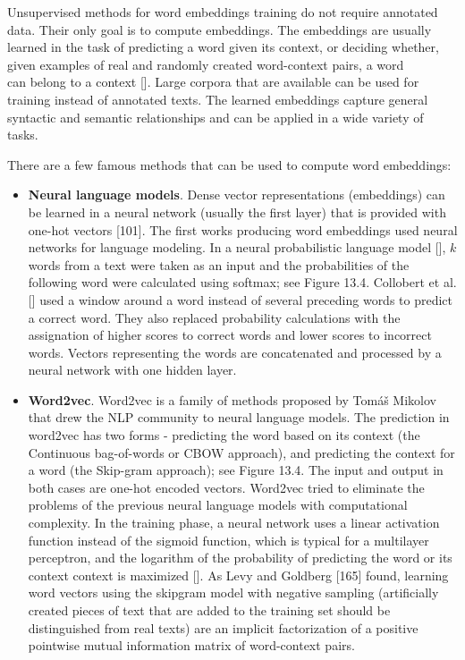 Unsupervised methods for word embeddings training do not require annotated data. Their only goal is to compute embeddings. The embeddings are usually learned in the task of predicting a word given its context, or deciding whether, given examples of real and randomly created word-context pairs, a word\\[0pt]
can belong to a context [\cite{ref101}]. Large corpora that are available can be used for training instead of annotated texts. The learned embeddings capture general syntactic and semantic relationships and can be applied in a wide variety of tasks.

There are a few famous methods that can be used to compute word embeddings:

\begin{itemize}
  \item \textbf{Neural language models}. Dense vector representations (embeddings) can be learned in a neural network (usually the first layer) that is provided with one-hot vectors [101]. The first works producing word embeddings used neural networks for language modeling. In a neural probabilistic language model [\cite{ref21}], $k$ words from a text were taken as an input and the probabilities of the following word were calculated using softmax; see Figure 13.4. Collobert et al. [\cite{ref57}] used a window around a word instead of several preceding words to predict a correct word. They also replaced probability calculations with the assignation of higher scores to correct words and lower scores to incorrect words. Vectors representing the words are concatenated and processed by a neural network with one hidden layer.
  \item \textbf{Word2vec}. Word2vec is a family of methods proposed by Tomáš Mikolov that drew the NLP community to neural language models. The prediction in word2vec has two forms - predicting the word based on its context (the Continuous bag-of-words or CBOW approach), and predicting the context for a word (the Skip-gram approach); see Figure 13.4. The input and output in both cases are one-hot encoded vectors. Word2vec tried to eliminate the problems of the previous neural language models with computational complexity. In the training phase, a neural network uses a linear activation function instead of the sigmoid function, which is typical for a multilayer perceptron, and the logarithm of the probability of predicting the word or its context context is maximized [\cite{ref194}].\newline
As Levy and Goldberg [165] found, learning word vectors using the skipgram model with negative sampling (artificially created pieces of text that are added to the training set should be distinguished from real texts) are an implicit factorization of a positive pointwise mutual information matrix of word-context pairs.\\

\end{itemize}
